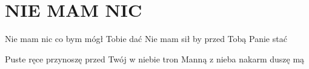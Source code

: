 \documentclass[../../../songbook.tex]{subfiles}
\begin{document}
\TabPositions{9cm} %
\section*{NIE MAM NIC}
{}
\vspace{0.5cm}
Nie mam nic co bym mógł Tobie dać		 \newline	
Nie mam sił by przed Tobą Panie stać	 \newline	

\-\hspace{1cm} Puste ręce przynoszę przed Twój w niebie tron		 \newline	
\-\hspace{1cm} Manną z nieba nakarm duszę mą						 \newline	
\end{document}
